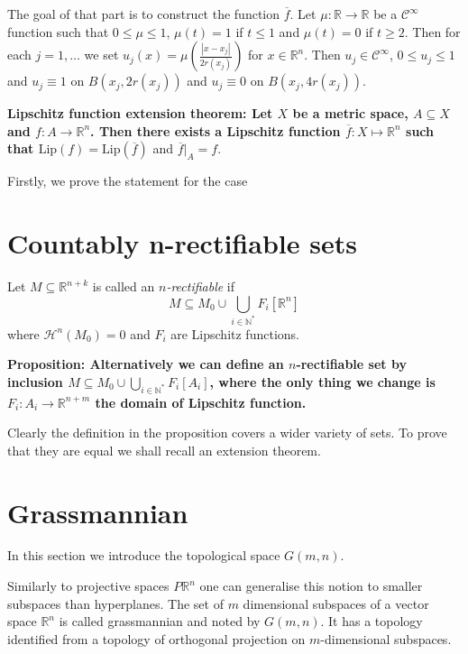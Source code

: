 \documentclass{article}
\begin{document}
\vspace{1ex}
The goal of that part is to construct the function $\overline f$. Let $\mu:
\mathbb{R}\rightarrow\mathbb{R}$ be a $\mathcal{C}^\infty$ function such that
$0\leq\mu\leq1$, $\mu(t) = 1$ if $t\leq 1$ and $\mu(t)=0$ if $t\geq 2$. Then
for each $j=1,\ldots$ we set $u_j(x)=\mu\left(\frac{|x-x_j|}{2r(x_j)}\right)$
for $x\in\mathbb{R}^n$. Then $u_j\in\mathcal{C}^\infty$, $0\leq u_j\leq1$ and
$u_j\equiv 1$ on $B(x_j, 2r(x_j))$ and $u_j\equiv 0$ on $B(x_j, 4r(x_j))$. 

\vspace{1ex}
\textbf{Lipschitz function extension theorem: Let $X$ be a metric space,
$A\subseteq X$ and $f:A\rightarrow\mathbb{R}^n$. Then there exists a Lipschitz
function $\overline f:X\mapsto\mathbb{R}^n$ such that $\text{Lip}(f)=\text{Lip}
(\overline f)$} and $\overline f|_A=f$.

\vspace{1ex}
Firstly, we prove the statement for the case  

\section{Countably n-rectifiable sets}
Let $M\subseteq\mathbb{R}^{n+k}$ is called an \emph{$n$-rectifiable} if
\[
    M\subseteq M_0\cup\bigcup_{i\in\mathbb{N}^*}F_i[\mathbb{R}^n]
\]
where $\mathcal{H}^n(M_0)=0$ and $F_i$ are Lipschitz functions.

\textbf{Proposition: Alternatively we can define an $n$-rectifiable set by
inclusion $M\subseteq M_0\cup\bigcup_{i\in\mathbb{N}^*}F_i[A_i]$, where the only
thing we change is $F_i:A_i\rightarrow\mathbb{R}^{n+m}$ the domain of Lipschitz
function.}

Clearly the definition in the proposition covers a wider variety of sets. To
prove that they are equal we shall recall an extension theorem.

\section{Grassmannian}

In this section we introduce the topological space $G(m,n)$.
\vspace{1ex}

Similarly to projective spaces $P\mathbb{R}^n$ one can generalise this notion to
smaller subspaces than hyperplanes. The set of $m$ dimensional subspaces of a
vector space $\mathbb{R}^n$ is called grassmannian and noted by $G(m,n)$. It
has a topology identified from a topology of orthogonal projection on
$m$-dimensional subspaces.
\end{document}
